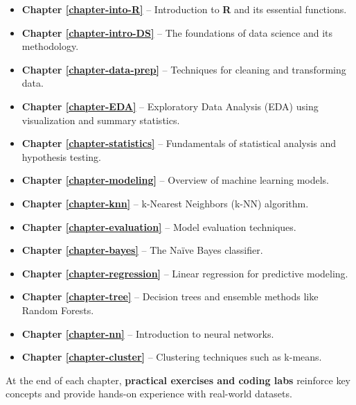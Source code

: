 \documentclass[
]{book}
\providecommand{\tightlist}{%
  \setlength{\itemsep}{0pt}\setlength{\parskip}{0pt}}
\theoremstyle{definition}
\theoremstyle{definition}
\theoremstyle{definition}
\theoremstyle{definition}
\theoremstyle{remark}
\begin{document}
\begin{itemize}
\tightlist
\item
  \textbf{Chapter \ref{chapter-into-R}} -- Introduction to \textbf{R} and its essential functions.\\
\item
  \textbf{Chapter \ref{chapter-intro-DS}} -- The foundations of data science and its methodology.\\
\item
  \textbf{Chapter \ref{chapter-data-prep}} -- Techniques for cleaning and transforming data.\\
\item
  \textbf{Chapter \ref{chapter-EDA}} -- Exploratory Data Analysis (EDA) using visualization and summary statistics.\\
\item
  \textbf{Chapter \ref{chapter-statistics}} -- Fundamentals of statistical analysis and hypothesis testing.\\
\item
  \textbf{Chapter \ref{chapter-modeling}} -- Overview of machine learning models.\\
\item
  \textbf{Chapter \ref{chapter-knn}} -- k-Nearest Neighbors (k-NN) algorithm.\\
\item
  \textbf{Chapter \ref{chapter-evaluation}} -- Model evaluation techniques.\\
\item
  \textbf{Chapter \ref{chapter-bayes}} -- The Naïve Bayes classifier.\\
\item
  \textbf{Chapter \ref{chapter-regression}} -- Linear regression for predictive modeling.\\
\item
  \textbf{Chapter \ref{chapter-tree}} -- Decision trees and ensemble methods like Random Forests.\\
\item
  \textbf{Chapter \ref{chapter-nn}} -- Introduction to neural networks.\\
\item
  \textbf{Chapter \ref{chapter-cluster}} -- Clustering techniques such as k-means.
\end{itemize}

At the end of each chapter, \textbf{practical exercises and coding labs} reinforce key concepts and provide hands-on experience with real-world datasets.
\end{document}
